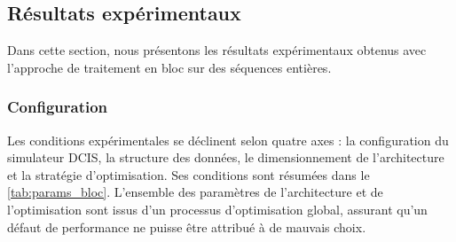 \subsection{Résultats expérimentaux}
\label{seq:blocresu}
Dans cette section, nous présentons les résultats expérimentaux obtenus avec l'approche de traitement en bloc sur des séquences entières.

\subsubsection{Configuration}
\label{seq:configglobal}
Les conditions expérimentales se déclinent selon quatre axes : la configuration du simulateur DCIS, la structure des données, le dimensionnement de l'architecture et la stratégie d'optimisation. Ses conditions sont résumées dans le \ref{tab:params_bloc}. L'ensemble des paramètres de l'architecture et de l'optimisation sont issus d'un processus d'optimisation global, assurant qu'un défaut de performance ne puisse être attribué à de mauvais choix.\\

